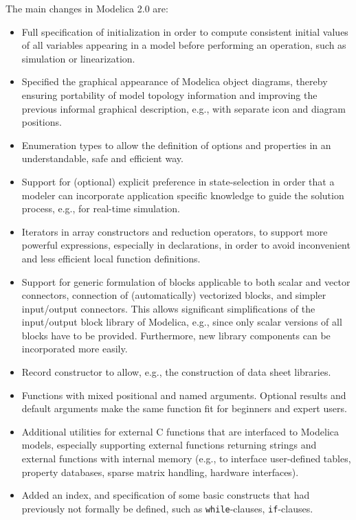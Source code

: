 The main changes in Modelica 2.0 are:
\begin{itemize}
\item
  Full specification of initialization in order to compute consistent
  initial values of all variables appearing in a model before performing
  an operation, such as simulation or linearization.
\item
  Specified the graphical appearance of Modelica object diagrams,
  thereby ensuring portability of model topology information and
  improving the previous informal graphical description, e.g., with
  separate icon and diagram positions.
\item
  Enumeration types to allow the definition of options and properties in
  an understandable, safe and efficient way.
\item
  Support for (optional) explicit preference in state-selection in order
  that a modeler can incorporate application specific knowledge to guide
  the solution process, e.g., for real-time simulation.
\item
  Iterators in array constructors and reduction operators, to support
  more powerful expressions, especially in declarations, in order to
  avoid inconvenient and less efficient local function definitions.
\item
  Support for generic formulation of blocks applicable to both scalar
  and vector connectors, connection of (automatically) vectorized
  blocks, and simpler input/output connectors. This allows significant
  simplifications of the input/output block library of Modelica, e.g.,
  since only scalar versions of all blocks have to be provided.
  Furthermore, new library components can be incorporated more easily.
\item
  Record constructor to allow, e.g., the construction of data sheet
  libraries.
\item
  Functions with mixed positional and named arguments. Optional results
  and default arguments make the same function fit for beginners and
  expert users.
\item
  Additional utilities for external C functions that are interfaced to
  Modelica models, especially supporting external functions returning
  strings and external functions with internal memory (e.g., to
  interface user-defined tables, property databases, sparse matrix
  handling, hardware interfaces).
\item
  Added an index, and specification of some basic constructs that had previously not formally be defined, such as \lstinline!while!-clauses, \lstinline!if!-clauses.
\end{itemize}

